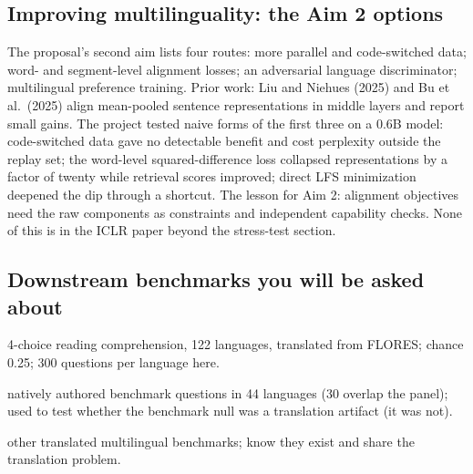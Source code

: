 \subsection{Improving multilinguality: the Aim 2 options}

The proposal's second aim lists four routes: more parallel and code-switched
data; word- and segment-level alignment losses; an adversarial language
discriminator; multilingual preference training. Prior work: Liu and Niehues
(2025) and Bu et al.\ (2025) align mean-pooled sentence representations in
middle layers and report small gains. The project tested naive forms of the
first three on a 0.6B model: code-switched data gave no detectable benefit
and cost perplexity outside the replay set; the word-level squared-difference
loss collapsed representations by a factor of twenty while retrieval scores
improved; direct LFS minimization deepened the dip through a shortcut. The
lesson for Aim 2: alignment objectives need the raw components as
constraints and independent capability checks. None of this is in the ICLR
paper beyond the stress-test section.

\subsection{Downstream benchmarks you will be asked about}

\begin{description}[leftmargin=2.6cm, style=nextline, itemsep=1pt]
\item[Belebele] 4-choice reading comprehension, 122 languages, translated from FLORES; chance 0.25; 300 questions per language here.
\item[INCLUDE] natively authored benchmark questions in 44 languages (30 overlap the panel); used to test whether the benchmark null was a translation artifact (it was not).
\item[Global-MMLU, MGSM, XNLI] other translated multilingual benchmarks; know they exist and share the translation problem.
\end{description}
